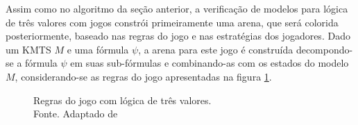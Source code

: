 \documentclass[normaltoc,capchap,capsec,times]{abnt}
\begin{document}
Assim como no algoritmo da seção anterior, a verificação de modelos para lógica de três valores com jogos constrói primeiramente uma arena, que será colorida posteriormente, baseado nas regras do jogo e nas estratégias dos jogadores. Dado um KMTS $M$ e uma fórmula $\psi$, a arena para este jogo é construída decompondo-se a fórmula $\psi$ em suas sub-fórmulas e combinando-as com os estados do modelo $M$, considerando-se as regras do jogo apresentadas na figura \ref{fig:regras3valores}.

\begin{figure}[htb]
\begin{center}
\end{center}
\caption[Regras do jogo com lógica de três valores]{ Regras do jogo com lógica de três valores. \\ Fonte. Adaptado de \cite{grumberglosing}}
\label{fig:regras3valores}
\end{figure}
\end{document}
